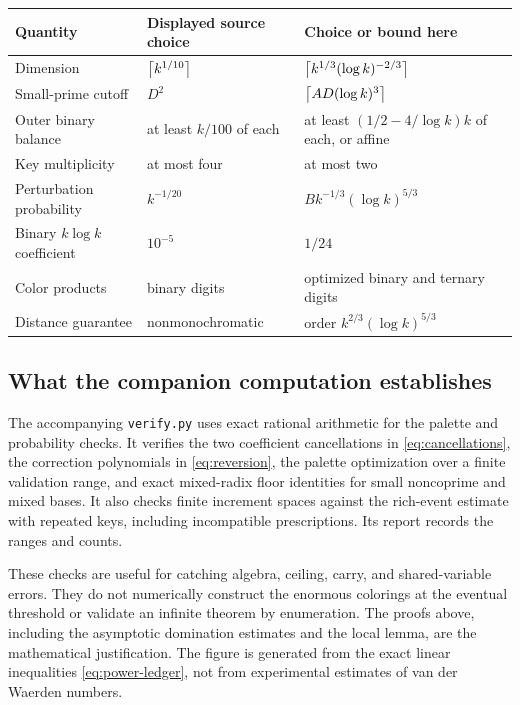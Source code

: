 \begin{center}
\small
\begin{tabular}{@{}>{\raggedright\arraybackslash}p{}>{\raggedright\arraybackslash}p{}>{\raggedright\arraybackslash}p{}@{}}
\toprule
Quantity&Displayed source choice&Choice or bound here\\
\midrule
Dimension&\(\left\lceil k^{1/10}\right\rceil\)&\(\left\lceil k^{1/3}(\log k)^{-2/3}\right\rceil\)\\
Small-prime cutoff&\(D^2\)&\(\left\lceil AD(\log k)^3\right\rceil\)\\
Outer binary balance&at least \(k/100\) of each&at least
\((1/2-4/\log k)k\) of each, or affine\\
Key multiplicity&at most four&at most two\\
Perturbation probability&\(k^{-1/20}\)&
\(Bk^{-1/3}(\log k)^{5/3}\)\\
Binary \(k\log k\) coefficient&\(10^{-5}\)&\(1/24\)\\
Color products&binary digits&optimized binary and ternary digits\\
Distance guarantee&nonmonochromatic&order
\(k^{2/3}(\log k)^{5/3}\)\\
\bottomrule
\end{tabular}
\end{center}

\subsection{What the companion computation establishes}

The accompanying \texttt{verify.py} uses exact rational arithmetic for
the palette and probability checks. It verifies the two coefficient
cancellations in \eqref{eq:cancellations}, the correction polynomials
in \eqref{eq:reversion}, the palette optimization over a finite
validation range, and exact mixed-radix floor identities for small
noncoprime and mixed bases. It also checks finite increment spaces
against the rich-event estimate with repeated keys, including
incompatible prescriptions. Its report records the ranges and counts.

These checks are useful for catching algebra, ceiling, carry, and
shared-variable errors. They do not numerically construct the enormous
colorings at the eventual threshold or validate an infinite theorem
by enumeration. The proofs above, including the asymptotic domination
estimates and the local lemma, are the mathematical justification.
The figure is generated from the exact linear inequalities
\eqref{eq:power-ledger}, not from experimental estimates of
van der Waerden numbers.

